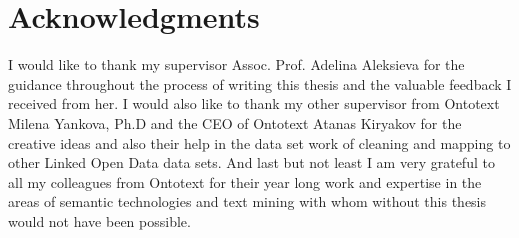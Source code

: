 

% 

\setcounter{page}{\thesavepage}
\begin{abstractpage}
\thispagestyle{empty}

\end{abstractpage}

\cleardoublepage

\section*{Acknowledgments}
I would like to thank my supervisor Assoc. Prof. Adelina Aleksieva for the guidance throughout the process of writing this thesis and the valuable feedback I received from her. I would also like to thank my other supervisor from Ontotext Milena Yankova, Ph.D and the CEO of Ontotext Atanas Kiryakov for the creative ideas and also their help in the data set work of cleaning and mapping to other Linked Open Data data sets. And last but not least I am very grateful to all my colleagues from Ontotext for their year long work and expertise in the areas of semantic technologies and text mining with whom without this thesis would not have been possible.

